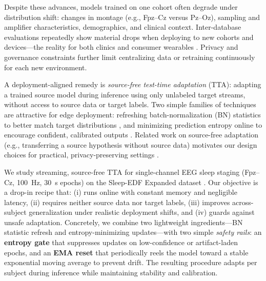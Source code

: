 \documentclass{article}
\begin{document}
Despite these advances, models trained on one cohort often degrade under distribution shift: changes in montage (e.g., Fpz--Cz versus Pz--Oz), sampling and amplifier characteristics, demographics, and clinical context. Inter-database evaluations repeatedly show material drops when deploying to new cohorts and devices---the reality for both clinics and consumer wearables \citep{alvarezestevez2021interdb}. Privacy and governance constraints further limit centralizing data or retraining continuously for each new environment.

A deployment-aligned remedy is \emph{source-free test-time adaptation} (TTA): adapting a trained source model during inference using only unlabeled target streams, without access to source data or target labels. Two simple families of techniques are attractive for edge deployment: refreshing batch-normalization (BN) statistics to better match target distributions \citep{li2016adabn}, and minimizing prediction entropy online to encourage confident, calibrated outputs \citep{wang2021tent}. Related work on source-free adaptation (e.g., transferring a source hypothesis without source data) motivates our design choices for practical, privacy-preserving settings \citep{liang2020shot}.

We study streaming, source-free TTA for single-channel EEG sleep staging (Fpz--Cz, 100~Hz, 30~s epochs) on the Sleep-EDF Expanded dataset \citep{kemp2000microcontinuity,sleepedfx2018}. Our objective is a drop-in recipe that: (i) runs online with constant memory and negligible latency, (ii) requires neither source data nor target labels, (iii) improves across-subject generalization under realistic deployment shifts, and (iv) guards against unsafe adaptation. Concretely, we combine two lightweight ingredients---BN statistic refresh and entropy-minimizing updates---with two simple \emph{safety rails}: an \textbf{entropy gate} that suppresses updates on low-confidence or artifact-laden epochs, and an \textbf{EMA reset} that periodically reels the model toward a stable exponential moving average to prevent drift. The resulting procedure adapts per subject during inference while maintaining stability and calibration.
\end{document}
